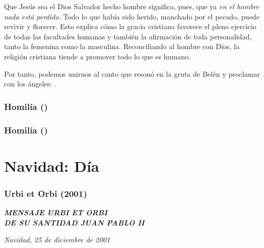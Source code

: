 Que Jesús sea el Dios Salvador hecho hombre significa, pues, que ya \emph{en el hombre nada está perdido}. Todo lo que había sido herido, manchado por el pecado, puede revivir y florecer. Esto explica cómo la gracia cristiana favorece el pleno ejercicio de todas las facultades humanas y también la afirmación de toda personalidad, tanto la femenina como la masculina. Reconciliando al hombre con Dios, la religión cristiana tiende a promover todo lo que es humano.

Por tanto, podemos unirnos al canto que resonó en la gruta de Belén y proclamar con los ángeles: .

\subsubsection{Homilía ()}

\subsubsection{Homilía ()}

\section{Navidad: Día} \subsubsection{Urbi et Orbi (2001)} \textbf{\emph{MENSAJE URBI ET ORBI\\ DE SU SANTIDAD JUAN PABLO II}}

\emph{Navidad, 25 de diciembre de 2001}

~

